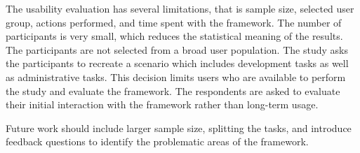 The usability evaluation has several limitations, that is sample size, selected user group, actions performed, and time spent with the framework.
The number of participants is very small, which reduces the statistical meaning of the results.
The participants are not selected from a broad user population.
The study asks the participants to recreate a scenario which includes development tasks as well as administrative tasks.
This decision limits users who are available to perform the study and evaluate the framework.
The respondents are asked to evaluate their initial interaction with the framework rather than long-term usage.

Future work should include larger sample size, splitting the tasks, and introduce feedback questions to identify the problematic areas of the framework.
